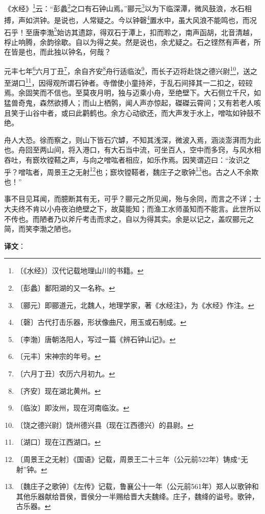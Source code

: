 \documentclass[12pt,UTF-8,openany,a4]{ctexbook}
\begin{document}
\begin{large}
    
    《水经》\footnote{〔《水经》〕\yiwen 汉代记载地理山川的书籍。}云：“彭蠡\footnote{〔彭蠡〕\yiwen 鄱阳湖的又一名称。}之口有石钟山焉。”郦元\footnote{〔郦元〕\yiwen 即郦道元，北魏人，地理学家，著《水经注》，为《水经》作注。}以为下临深潭，微风鼓浪，水石相搏，声如洪钟。是说也，人常疑之。今以钟磬\footnote{〔磬〕\yiwen 古代打击乐器，形状像曲尺，用玉或石制成。}置水中，虽大风浪不能鸣也，而况石乎！至唐李渤\footnote{〔李渤〕\yiwen 唐朝洛阳人，写过一篇《辨石钟山记》。}始访其遗踪，得双石于潭上，扣而聆之，南声函胡，北音清越，桴止响腾，余韵徐歇。自以为得之矣。然是说也，余尤疑之。石之铿然有声者，所在皆是也，而此独以钟名，何哉？
    
    元丰七年\footnote{〔元丰〕\yiwen 宋神宗的年号。}六月丁丑\footnote{〔六月丁丑〕\yiwen 农历六月初九。}，余自齐安\footnote{〔齐安〕\yiwen 现在湖北黄州。}舟行适临汝\footnote{〔临汝〕\yiwen 即汝州，现在河南临汝。}，而长子迈将赴饶之德兴尉\footnote{〔饶之德兴尉〕\yiwen 饶州德兴县（现在江西德兴）的县尉。}，送之至湖口\footnote{〔湖口〕\yiwen 现在江西湖口。}，因得观所谓石钟者。寺僧使小童持斧，于乱石间择其一二扣之，硿硿焉。余固笑而不信也。至莫夜月明，独与迈乘小舟，至绝壁下。大石侧立千尺，如猛兽奇鬼，森然欲搏人；而山上栖鹘，闻人声亦惊起，磔磔云霄间；又有若老人咳且笑于山谷中者，或曰此鹳鹤也。余方心动欲还，而大声发于水上，噌吰如钟鼓不绝。
    
    舟人大恐。徐而察之，则山下皆石穴罅，不知其浅深，微波入焉，涵淡澎湃而为此也。舟回至两山间，将入港口，有大石当中流，可坐百人，空中而多窍，与风水相吞吐，有窾坎镗鞳之声，与向之噌吰者相应，如乐作焉。因笑谓迈曰：“汝识之乎？噌吰者，周景王之无射\footnote{〔周景王之无射〕\yiwen 《国语》记载，周景王二十三年（公元前522年）铸成“无射”钟。}也；窾坎镗鞳者，魏庄子之歌钟\footnote{〔魏庄子之歌钟〕\yiwen 《左传》记载，鲁襄公十一年（公元前561年）郑人以歌钟和其他乐器献给晋侯，晋侯分一半赐给晋大夫魏绛。庄子，魏绛的谥号。歌钟，古乐器。}也。古之人不余欺也！”
    
    事不目见耳闻，而臆断其有无，可乎？郦元之所见闻，殆与余同，而言之不详；士大夫终不肯以小舟夜泊绝壁之下，故莫能知；而渔工水师虽知而不能言。此世所以不传也。而陋者乃以斧斤考击而求之，自以为得其实。余是以记之，盖叹郦元之简，而笑李渤之陋也。

\end{large}


\newpage

\begin{Large}
   \noindent \textbf{译文}：
\end{Large}
\end{document}

